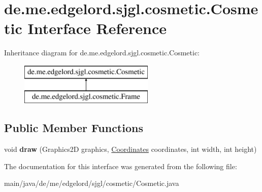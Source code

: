 \hypertarget{interfacede_1_1me_1_1edgelord_1_1sjgl_1_1cosmetic_1_1_cosmetic}{}\section{de.\+me.\+edgelord.\+sjgl.\+cosmetic.\+Cosmetic Interface Reference}
\label{interfacede_1_1me_1_1edgelord_1_1sjgl_1_1cosmetic_1_1_cosmetic}
Inheritance diagram for de.\+me.\+edgelord.\+sjgl.\+cosmetic.\+Cosmetic\+:\begin{figure}[H]
\begin{center}
\leavevmode
\includegraphics[height=2.000000cm]{interfacede_1_1me_1_1edgelord_1_1sjgl_1_1cosmetic_1_1_cosmetic}
\end{center}
\end{figure}
\subsection*{Public Member Functions}
\begin{DoxyCompactItemize}
\item 
\mbox{\label{interfacede_1_1me_1_1edgelord_1_1sjgl_1_1cosmetic_1_1_cosmetic_a07b6d84b7267383a047492f604c07ff8}} 
void {\bfseries draw} (Graphics2D graphics, \mbox{\hyperlink{classde_1_1me_1_1edgelord_1_1sjgl_1_1location_1_1_coordinates}{Coordinates}} coordinates, int width, int height)
\end{DoxyCompactItemize}


The documentation for this interface was generated from the following file\+:\begin{DoxyCompactItemize}
\item 
main/java/de/me/edgelord/sjgl/cosmetic/Cosmetic.\+java\end{DoxyCompactItemize}
